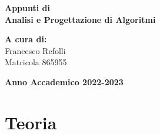 \documentclass[a4paper,12pt,oneside]{book}
\begin{document}
    
    \begin{titlepage}
        
	\vspace{40mm}
        
	\begin{center}
            {\LARGE{
                    \textbf{Appunti di \\ Analisi e Progettazione di Algoritmi}
                    \par
            }}
        \end{center}
        
        \vspace{50mm}

        \begin{flushright}
            {\large \textbf{A cura di:}} \\
            \large{Francesco Refolli} \\
            \large{Matricola 865955} 
        \end{flushright}
        
        \vspace{40mm}
        \begin{center}
            {\large{\bf Anno Accademico 2022-2023}}
        \end{center}

        \restoregeometry
        
    \end{titlepage}
    
    \printindex
    
    
    \part{Teoria}
    
    
    
    
    
    
    
    

    
    
    
    
    
    
    
\end{document}
